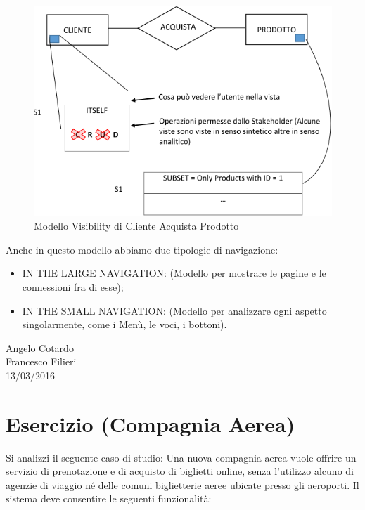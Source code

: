 \begin{center}
\begin{figure}[H]
\centering
\includegraphics[scale=1]{figures/cap_visibility.png}
\caption{Modello Visibility di Cliente Acquista Prodotto}
\end{figure}
\end{center}

Anche in questo modello abbiamo due tipologie di navigazione:

\begin{itemize}

\item{IN THE LARGE NAVIGATION}: (Modello per mostrare le pagine e le connessioni fra di esse);
\item{IN THE SMALL NAVIGATION}: (Modello per analizzare ogni aspetto singolarmente, come i Menù, le voci, i bottoni). 

\end{itemize}



\begin{flushright}Angelo Cotardo\\Francesco Filieri\\13/03/2016\end{flushright}


\section{Esercizio (Compagnia Aerea)}

Si analizzi il seguente caso di studio:
Una nuova compagnia aerea vuole offrire un servizio di prenotazione e di acquisto di biglietti online, senza l’utilizzo alcuno di agenzie di viaggio né delle comuni biglietterie aeree ubicate presso gli aeroporti. Il sistema deve consentire le seguenti funzionalità:

